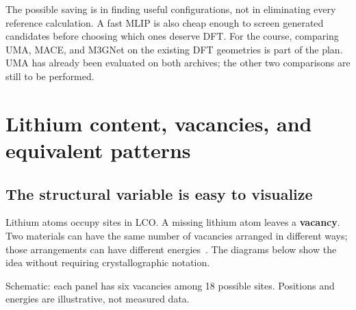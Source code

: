 The possible saving is in finding useful configurations, not in eliminating every reference calculation. A fast MLIP is also cheap enough to screen generated candidates before choosing which ones deserve DFT. For the course, comparing UMA, MACE, and M3GNet on the existing DFT geometries is part of the plan. UMA has already been evaluated on both archives; the other two comparisons are still to be performed.


\clearpage
\section{Lithium content, vacancies, and equivalent patterns}\label{sec:vacancies}

\subsection*{The structural variable is easy to visualize}
Lithium atoms occupy sites in LCO. A missing lithium atom leaves a \textbf{vacancy}. Two materials can have the same number of vacancies arranged in different ways; those arrangements can have different energies~\cite{wolverton}. The diagrams below show the idea without requiring crystallographic notation.

\begin{center}
\end{center}
{\small\textcolor{slate}{Schematic: each panel has six vacancies among 18 possible sites. Positions and energies are illustrative, not measured data.}}

